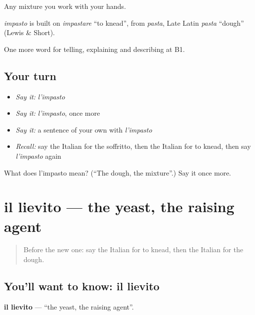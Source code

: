 Any mixture you work with your hands.

\begin{cousinweb}
\emph{impasto} is built on \emph{impastare} \textquotedblleft{}to knead\textquotedblright{}, from \emph{pasta}, Late Latin \emph{pasta} \textquotedblleft{}dough\textquotedblright{} (Lewis \& Short).
\end{cousinweb}

\begin{grammarlens}[title={What you've built}]
One more word for telling, explaining and describing at B1.
\end{grammarlens}

\subsection*{Your turn}
\begin{itemize}
\raggedright
  \item \emph{Say it:} \emph{l'impasto}
  \item \emph{Say it:} \emph{l'impasto}, once more
  \item \emph{Say it:} a sentence of your own with \emph{l'impasto}
  \item \emph{Recall:} say the Italian for the soffritto, then the Italian for to knead, then say \emph{l'impasto} again
\end{itemize}

\begin{tcolorbox}[breakable,colback=teal!4,colframe=teal!35!black,title={Before you move on}]
What does l'impasto mean? (\textquotedblleft{}The dough, the mixture\textquotedblright{}.) Say it once more.
\end{tcolorbox}
\section[il lievito]{il lievito — the yeast, the raising agent}

\label{lesson:IT-C335-lievito}



\begin{quote}
Before the new one: say the Italian for to knead, then the Italian for the dough.
\end{quote}

\subsection*{You'll want to know: il lievito}
\textbf{il lievito} — \textquotedblleft{}the yeast, the raising agent\textquotedblright{}.

